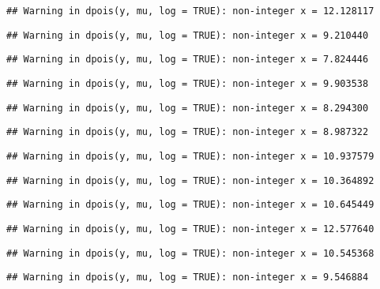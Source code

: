\documentclass[
]{article}
\begin{document}
\begin{verbatim}
## Warning in dpois(y, mu, log = TRUE): non-integer x = 12.128117
\end{verbatim}

\begin{verbatim}
## Warning in dpois(y, mu, log = TRUE): non-integer x = 9.210440
\end{verbatim}

\begin{verbatim}
## Warning in dpois(y, mu, log = TRUE): non-integer x = 7.824446
\end{verbatim}

\begin{verbatim}
## Warning in dpois(y, mu, log = TRUE): non-integer x = 9.903538
\end{verbatim}

\begin{verbatim}
## Warning in dpois(y, mu, log = TRUE): non-integer x = 8.294300
\end{verbatim}

\begin{verbatim}
## Warning in dpois(y, mu, log = TRUE): non-integer x = 8.987322
\end{verbatim}

\begin{verbatim}
## Warning in dpois(y, mu, log = TRUE): non-integer x = 10.937579
\end{verbatim}

\begin{verbatim}
## Warning in dpois(y, mu, log = TRUE): non-integer x = 10.364892
\end{verbatim}

\begin{verbatim}
## Warning in dpois(y, mu, log = TRUE): non-integer x = 10.645449
\end{verbatim}

\begin{verbatim}
## Warning in dpois(y, mu, log = TRUE): non-integer x = 12.577640
\end{verbatim}

\begin{verbatim}
## Warning in dpois(y, mu, log = TRUE): non-integer x = 10.545368
\end{verbatim}

\begin{verbatim}
## Warning in dpois(y, mu, log = TRUE): non-integer x = 9.546884
\end{verbatim}
\end{document}
